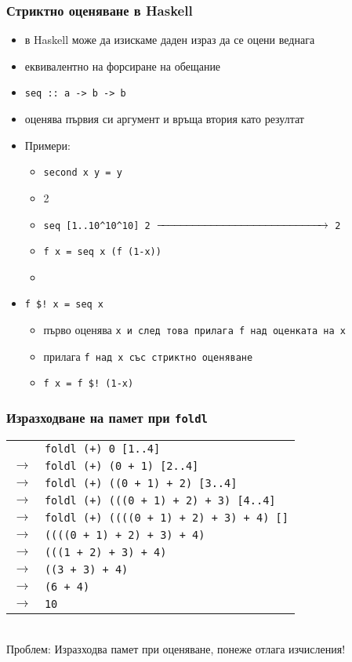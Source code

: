 \documentclass{beamer}
\begin{document}
\begin{frame}
  \frametitle{Стриктно оценяване в Haskell}
  \begin{itemize}[<+->]
  \item в Haskell може да изискаме даден израз да се оцени веднага
  \item еквивалентно на форсиране на обещание
  \item \tt{seq :: a -> b -> b}
  \item оценява първия си аргумент и връща втория като резултат
  \item Примери:
    \begin{itemize}
    \item \tt{second x y = y}
    \item {}2
    \item \tt{seq [1..10\^{}10\^{}10] 2} $\xrightarrow{\hspace{35ex}}$ \tt 2
    \item \tt{f x = seq x (f (1-x))}
    \item {}
    \end{itemize}
  \item \tt{f \$! x = seq x }
    \begin{itemize}
    \item първо оценява \tt x и след това прилага \tt f над оценката на \tt x
    \item прилага \tt f над \tt x със стриктно оценяване
    \item \tt{f x = f \$! (1-x)}
    \end{itemize}
  \end{itemize}
\end{frame}

\begin{frame}
  \frametitle{Изразходване на памет при \tt{foldl}}
  \newcommand{\lra}{\onslide<+->$\longrightarrow$}
  \begin{tabular}{rl}
    &\tt{foldl (+) 0 [1..4]}\\
    \pause
   \lra&\tt{foldl (+) (0 + 1) [2..4]}\\
   \lra&\tt{foldl (+) ((0 + 1) + 2) [3..4]}\\
   \lra&\tt{foldl (+) (((0 + 1) + 2) + 3) [4..4]}\\
   \lra&\tt{foldl (+) ((((0 + 1) + 2) + 3) + 4) []}\\
   \lra&\tt{((((0 + 1) + 2) + 3) + 4)}\\
   \lra&\tt{(((1 + 2) + 3) + 4)}\\
   \lra&\tt{((3 + 3) + 4)}\\
   \lra&\tt{(6 + 4)}\\
   \lra&\tt{10}
  \end{tabular}\\[2em]
  \onslide<+->
  \alert{Проблем:} Изразходва памет при оценяване, понеже отлага изчисления!
\end{frame}
\end{document}
